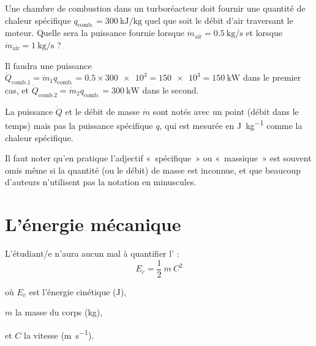 \begin{description}
			\begin{anexample}
				Une chambre de combustion dans un turboréacteur doit fournir une quantité de chaleur spécifique $q_{\text{comb.}} = \SI{300}{\kilo\joule\per\kilogram}$ quel que soit le débit d’air traversant le moteur. Quelle sera la puissance fournie lorsque $\dot{m}_\text{air} = \SI{0,5}{\kilogram\per\second}$ et lorsque $\dot{m}_\text{air} = \SI{1}{\kilogram\per\second}$ ?
		
				\begin{answer}Il faudra une puissance $\dot{Q}_{\text{comb.}1} = \dot{m}_1 q_{\text{comb.}} = \num{0,5} \times \num{300e3} = \num{150e3} = \SI{150}{\kilo\watt}$ dans le premier cas, et $\dot{Q}_{\text{comb.}2} = \dot{m}_2 q_{\text{comb.}} = \SI{300}{\kilo\watt}$ dans le second.
					\begin{remark}La puissance $\dot{Q}$ et le débit de masse $\dot{m}$ sont notés avec un point (débit dans le temps) mais pas la puissance spécifique $q$, qui est mesurée en \si{\joule\per\kilogram} comme la chaleur spécifique.\end{remark}\end{answer}
			\end{anexample}
		
		\end{description}

		Il faut noter qu’en pratique l’adjectif «~spécifique~» ou «~massique~» est souvent omis même si la quantité (ou le débit) de masse est inconnue, et que beaucoup d’auteurs n’utilisent pas la notation en minuscules.
		
\section{L’énergie mécanique}
\label{ch_energie_mecanique}

	L’étudiant/e n’aura aucun mal à quantifier l’ :
	\begin{equation}
	E_{c} = \frac{1}{2} \ m \ C^2
	\label{eq_énergie_cinétique}
	\end{equation}
	\begin{equationterms}
		\item où \tab $E_{c}$ 	\tab est l’énergie cinétique (\si{\joule}),
		\item 	\tab $m$ 		\tab la masse du corps (\si{\kilogram}),
		\item et	\tab $C$			\tab la vitesse (\si{\metre\per\second}).
	\end{equationterms}

